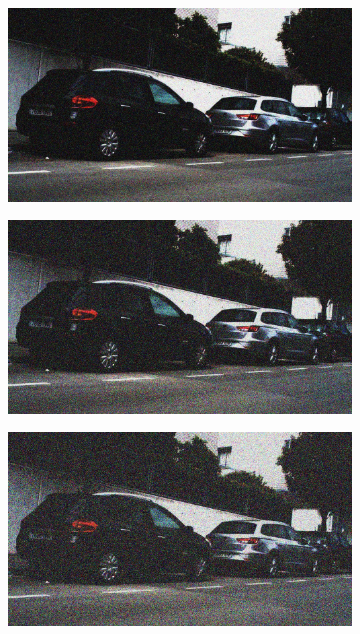 \documentclass[a4paper]{ctexart}
\begin{document}
\begin{figure}[htbp]
\begin{subfigure}{0.08\textwidth}
				\label{fig：Gamma=0.2, Gauss Noise = 0.1}
			\end{subfigure}
			\begin{subfigure}{0.08\textwidth}
				\captionsetup{font=scriptsize}
				\includegraphics[width=\linewidth]{picture/Edge Detection/degrade/RGB_001 Gamma=0.2, Gauss Noise=0.2}
				\label{fig：Gamma=0.2, Gauss Noise = 0.2}
			\end{subfigure}
			\begin{subfigure}{0.08\textwidth}
				\captionsetup{font=scriptsize}
				\includegraphics[width=\linewidth]{picture/Edge Detection/degrade/RGB_001 Gamma=0.2, Gauss Noise=0.3}
				\label{fig：Gamma=0.2, Gauss Noise = 0.3}
			\end{subfigure}
			\begin{subfigure}{0.08\textwidth}
				\captionsetup{font=scriptsize}
				\includegraphics[width=\linewidth]{picture/Edge Detection/degrade/RGB_001 Gamma=0.2, Gauss Noise=0.4}

\end{subfigure}
\end{figure}
\end{document}
